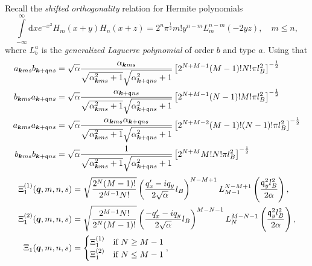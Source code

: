 Recall the \emph{shifted orthogonality} relation for Hermite polynomials~\cite[Eq. (7.377)]{gradshteinTableIntegralsSeries2015}
\begin{equation}
  \label{eq:hermite-shift-ortho}
  \int\limits_{-\infty }^{\infty } \mathrm{d}x
  e^{-x^2} H_m(x+y) H_n(x+z)
  = 2^n \pi^{\frac{1}{2}} m! y^{n-m} L^{n-m}_m(-2yz), \quad m\leq n,
\end{equation}
where \(L^{a}_{b}\) is the \emph{generalized Laguerre polynomial} of order \(b\) and type \(a\).
Using that
\begin{align}
  a_{\bm{k} m s} b_{\bm{k} +\mathfrak{q} ns}
  &=
    \sqrt{\alpha } \frac{\alpha_{\bm{k} m s}}{\sqrt{\alpha _{\bm{k} m s} ^2 + 1} \sqrt{\alpha _{\bm{k} + \mathfrak{q} ns} ^2  + 1}  }
    \left[
    2^{N+M-1} (M-1)! N! \pi l_{B}^2
    \right  ]^{-\frac{1}{2}}\\
  b_{\bm{k} m s} a_{\bm{k} +\mathfrak{q} ns}
  &=
    \sqrt{\alpha } \frac{\alpha_{\bm{k} + \mathfrak{q} n s}}{\sqrt{\alpha _{\bm{k} m s} ^2 + 1} \sqrt{\alpha _{\bm{k} + \mathfrak{q} ns} ^2  + 1}  }
    \left[
    2^{N+M-1} (N-1)! M! \pi l_{B}^2
    \right  ]^{-\frac{1}{2}}\\
  a_{\bm{k} m s} a_{\bm{k} +\mathfrak{q} ns}
  &=
    \sqrt{\alpha } \frac{\alpha_{\bm{k} m s} \alpha_{\bm{k} + \mathfrak{q} n s}}{
    \sqrt{\alpha _{\bm{k} m s} ^2 + 1} \sqrt{\alpha _{\bm{k} + \mathfrak{q} ns} ^2  + 1}
    }
    \left[
    2^{N+M-2} (M-1)! (N-1)! \pi l_{B}^2
    \right  ]^{-\frac{1}{2}}\\
  b_{\bm{k} m s} b_{\bm{k} +\mathfrak{q} ns}
  &=
    \sqrt{\alpha } \frac{1}{
    \sqrt{\alpha _{\bm{k} m s} ^2 + 1} \sqrt{\alpha _{\bm{k} + \mathfrak{q} ns} ^2  + 1}
    }
    \left[
    2^{N+M} M! N! \pi l_{B}^2
    \right  ]^{-\frac{1}{2}}\\
\end{align}
\begin{align}
  \Xi_1 ^{(1)}(\bm{q}, m, n, s) &= \sqrt{\frac{2^N (M-1)!}{2^{M-1} N!}}
                                   \left( \frac{q'_x - iq_y}{2 \sqrt{\alpha } } l_B \right)^{N-M + 1}
                                   L^{N-M+1}_{M-1} \left( \frac{\mathfrak{q}_y^2 l_B^2}{2 \alpha } \right),\\
  \Xi_1 ^{(2)}(\bm{q}, m, n, s) &= \sqrt{\frac{2^{M-1} N!}{2^N (M-1)!}}
                                   \left( \frac{-q'_x - iq_y}{2 \sqrt{\alpha } } l_B \right)^{M-N - 1}
                                   L^{M - N - 1}_N \left( \frac{\mathfrak{q}_y^2 l_B^2}{2 \alpha } \right),\\
  \Xi_1(\bm{q}, m, n, s) &=
          \begin{cases}
            \Xi _1 ^{(1)} & \text{if } N \geq M-1\\
            \Xi _1 ^{(2)} & \text{if } N \leq M-1
          \end{cases},
\end{align}
